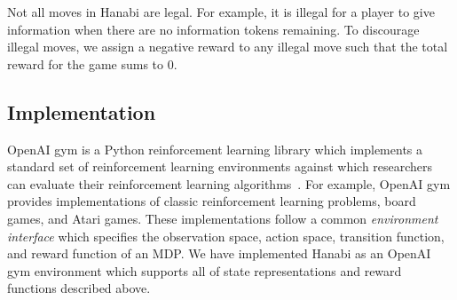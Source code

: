 Not all moves in Hanabi are legal. For example, it is illegal for a player to
give information when there are no information tokens remaining. To discourage
illegal moves, we assign a negative reward to any illegal move such that the
total reward for the game sums to 0.


\subsection{Implementation}
OpenAI gym is a Python reinforcement learning library which implements a
standard set of reinforcement learning environments against which researchers
can evaluate their reinforcement learning algorithms~\cite{brockman2016openai}.
For example, OpenAI gym provides implementations of classic reinforcement
learning problems, board games, and Atari games. These implementations follow a
common \emph{environment interface} which specifies the observation space,
action space, transition function, and reward function of an MDP. We have
implemented Hanabi as an OpenAI gym environment which supports all of state
representations and reward functions described above.

